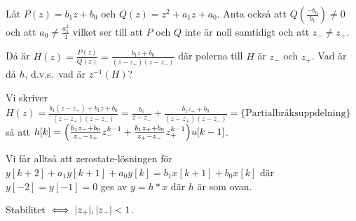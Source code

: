 \documentclass[a4paper]{article}
\begin{document}
\begin{ex}
    Låt \(
        P(z) = b_1z + b_0
    \) och \(
        Q(z) = z^2+a_1z+a_0
    \). Anta också att \(
        Q(\frac{-b_0}{b_1}) \neq 0
    \) och att \(
        a_0 \neq \frac{a_1^2}{4} 
    \) vilket ser till att \(
        P
    \) och \(
        Q
    \) inte är noll samtidigt och att \(
        z_- \neq z_+
    \).

    Då är \(
        H(z) = \frac{P(z)}{Q(z)} = \frac{b_1z+b_0}{(z-z_+)(z-z_-)} 
    \) där polerna till \(
        H
    \) är \(
        z_- 
    \) och \(
        z_+
    \). Vad är då \(
        h
    \), d.v.s.\ vad är \(
        z^{-1}(H)
    \)?

    Vi skriver \(
        H(z) = \frac{b_1(z-z_+) + b_1 z + b_0}{(z-z_+)(z-z_-)}
             = \frac{b_1}{z-z_-} + \frac{b_1z_+  +b_0}{(z-z_+)(z-z_-)}
             = \{\text{Partialbråksuppdelning}\}
    \) så att \(
        h[k] = \qty(\frac{b_1z_-+b_0}{z_--z_+} z_-^{k-1} + \frac{b_1z_++b_0}{z_+-z_-} z_+^{k-1}) u[k-1]
    \).

    Vi får alltså att zerostate-lösningen för \(
        y[k +2] + a_1y[k+1]+a_0y[k] = b_1x[k+1]+b_0x[k]
    \) där \(
        y[-2] = y[-1] = 0
    \) ges av \(
        y = h*x
    \) där \(
        h
    \) är som ovan.

    Stabilitet \(
        \iff \abs{z_+}, \abs{z_-} < 1
    \).
\end{ex}
\end{document}
